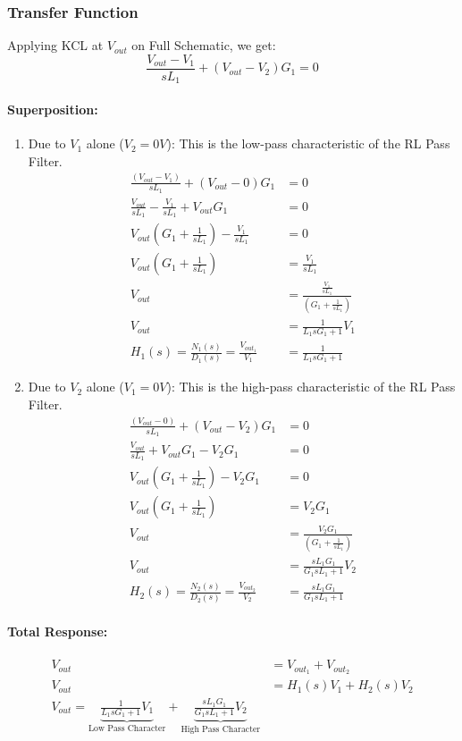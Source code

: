 \subsubsection{Transfer Function}
Applying KCL at $V_{out}$ on Full Schematic, we get:
\[
  \frac{V_{out} - V_{1}}{sL_1} + (V_{out} - V_{2}){G_1} = 0
\]
\paragraph{Superposition:}
\begin{enumerate}
  \item Due to \(V_{1}\) alone (\(V_{2} = 0V\)):
    This is the low-pass characteristic of the RL Pass Filter.
    \begin{align*}
      \frac{(V_{out} - V_{1})}{sL_1} + (V_{out} - 0){G_1} &= 0 \\
      \frac{V_{out}}{sL_1} - \frac{V_{1}}{sL_1} + V_{out}G_1 &= 0 \\
      V_{out}(G_1 + \frac{1}{sL_1}) - \frac{V_{1}}{sL_1} &= 0 \\
      V_{out}(G_1 + \frac{1}{sL_1}) &= \frac{V_{1}}{sL_1} \\
      V_{out} &= \frac{\frac{V_{1}}{sL_1}}{(G_1 + \frac{1}{sL_1})} \\
      V_{out} &= \frac{1}{L_1 s G_1 + 1}V_{1} \\
      H_1(s) = \frac{N_1(s)}{D_1(s)} = \frac{V_{out_1}}{V_{1}} &= \frac{1}{L_1 s G_1 + 1}
    \end{align*}
  \item Due to \(V_{2}\) alone (\(V_{1} = 0V\)):
    This is the high-pass characteristic of the RL Pass Filter.
    \begin{align*}
      \frac{(V_{out} - 0)}{sL_1} + (V_{out} - V_{2}){G_1} &= 0 \\
      \frac{V_{out}}{sL_1} + V_{out}G_1 - V_{2}G_1 &= 0 \\
      V_{out}(G_1 + \frac{1}{sL_1}) - V_{2}G_1 &= 0 \\
      V_{out}(G_1 + \frac{1}{sL_1}) &= V_{2}G_1 \\
      V_{out} &= \frac{V_{2}G_1}{(G_1 + \frac{1}{sL_1})} \\
      V_{out} &= \frac{sL_1 G_1}{G_1 s L_1 + 1}V_{2} \\
      H_2(s) = \frac{N_2(s)}{D_2(s)} = \frac{V_{out_2}}{V_{2}} &= \frac{sL_1 G_1}{G_1 s L_1 + 1}
    \end{align*}
\end{enumerate}
\paragraph{Total Response:}
\begin{align*}
  V_{out} &= V_{out_1} + V_{out_2} \\
  V_{out} &= H_1(s) V_{1} + H_2(s) V_{2} \\
  V_{out} = \underbrace{\frac{1}{L_1 s G_1 + 1}V_{1}}_{\text{Low Pass Character}} + \underbrace{\frac{sL_1 G_1}{G_1 s L_1 + 1}V_{2}}_{\text{High Pass Character}}
\end{align*}

